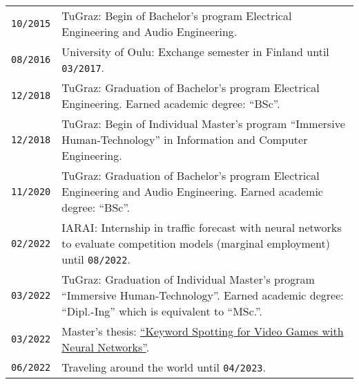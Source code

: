 {\begin{tabularx}{\columnwidth}{>{\centering\arraybackslash}p{1.5cm} | p{12cm}}
  \texttt{10/2015} & TuGraz: Begin of Bachelor's program Electrical Engineering and Audio Engineering.\\
  \texttt{08/2016} & University of Oulu: Exchange semester in Finland until \texttt{03/2017}.\\
  \texttt{12/2018} & TuGraz: Graduation of Bachelor's program Electrical Engineering. Earned academic degree: \enquote{BSc}.\\
  \texttt{12/2018} & TuGraz: Begin of Individual Master's program \enquote{Immersive Human-Technology} in Information and Computer Engineering.\\
  \texttt{11/2020} & TuGraz: Graduation of Bachelor's program Electrical Engineering and Audio Engineering. Earned academic degree: \enquote{BSc}.\\
  \texttt{02/2022} & IARAI: Internship in traffic forecast with neural networks to evaluate competition models (marginal employment) until \texttt{08/2022}.\\
  \texttt{03/2022} & TuGraz: Graduation of Individual Master's program \enquote{Immersive Human-Technology}. Earned academic degree: \enquote{Dipl.-Ing} which is equivalent to \enquote{MSc.}.\\
  \texttt{03/2022} & Master's thesis: \href{https://github.com/chrisworld/kws_game}{\enquote{Keyword Spotting for Video Games with Neural Networks}}.\\
  \texttt{06/2022} & Traveling around the world until \texttt{04/2023}.\\
\end{tabularx}
}